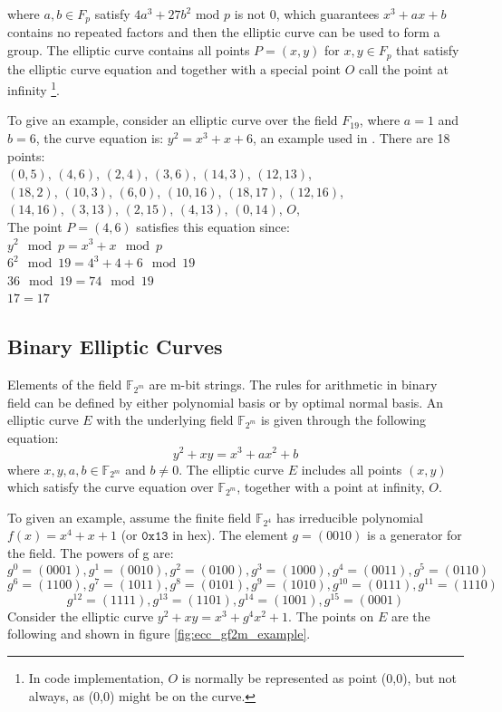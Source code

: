 where $a,b \in F_p$ satisfy $4a^3 + 27b^2 \text{ mod }p$ is not 0, which guarantees $x^3 + ax + b$ contains no repeated factors and then the elliptic curve can be used to form a group. The elliptic curve contains all points $P = (x,y)$ for $x,y \in F_p$ that satisfy the elliptic curve equation and together with a special point $O$ call the point at infinity \footnote{In code implementation, $O$ is normally be represented as point (0,0), but not always, as (0,0) might be on the curve.}.   
    
To give an example, consider an elliptic curve over the field $F_{19}$, where $a=1$ and $b=6$, the curve equation is: $y^2 = x^3 + x + 6$, an example used in \cite{balasubramanian1998improbability}. There are 18 points: \\
$ (0,5)$, $(4,6)$, $(2,4)$, $(3,6)$, $(14,3)$, $(12,13)$, \\
$ (18,2)$, $(10,3)$, $(6,0)$, $(10,16)$, $(18,17)$, $(12,16)$, \\
$ (14,16)$, $(3,13)$, $(2,15)$, $(4,13)$, $(0,14)$, $O$, \\

The point $P=(4,6)$ satisfies this equation since: \\
$ y^2 \mod{p} = x^3 + x \mod{p}$ \\
$ 6^2 \mod{19} = 4^3 + 4 + 6 \mod{19} $\\
$ 36 \mod{19} = 74 \mod{19} $\\
$ 17 = 17 $ \\
\subsection{Binary Elliptic Curves}
Elements of the field $\mathbb{F}_{2^m}$ are m-bit strings. The rules for arithmetic in binary field can be defined by either polynomial basis or by optimal normal basis\cite{IEEEP1363}. An elliptic curve $E$ with the underlying field $\mathbb{F}_{2^m}$ is given through the following equation: $$y^2+xy=x^3+ax^2+b$$ where $x,y,a,b \in \mathbb{F}_{2^m}$ and $b \neq 0$. The elliptic curve $E$ includes all points $(x,y)$ which satisfy the curve equation over $\mathbb{F}_{2^m}$, together with a point at infinity, $O$. 

To given an example, assume the finite field $\mathbb{F}_{2^4}$ has irreducible polynomial $f(x)=x^4+x+1$ (or $\mathtt{0x13}$ in hex). The element $g = (0010)$ is a generator for the field. The powers of g are:
$$g^0=(0001), g^1=(0010), g^2=(0100), g^3=(1000), g^4=(0011),g^5=(0110)$$
$$g^6=(1100), g^7=(1011), g^8=(0101), g^9=(1010), g^{10}=(0111),g^{11}=(1110)$$
$$g^{12}=(1111), g^{13}=(1101), g^{14}=(1001), g^{15}=(0001)$$
Consider the elliptic curve $y^2+xy=x^3+g^4x^2+1$. The points on $E$ are the following and shown in figure \ref{fig:ecc_gf2m_example}.

